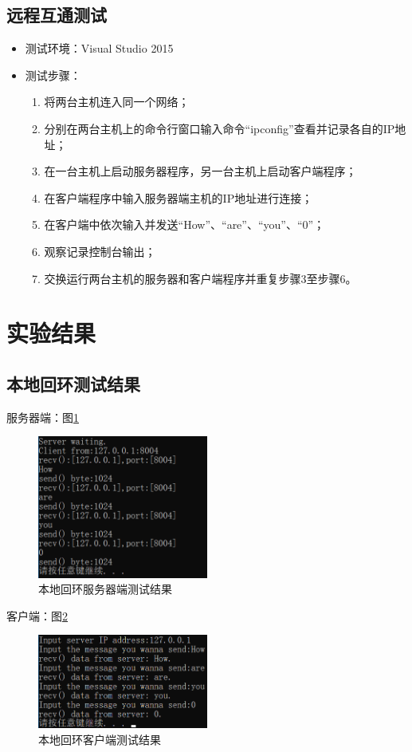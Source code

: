 \documentclass[a4paper]{ctexrep}
\begin{document}
\begin{spacing}{1.5}
\subsection{远程互通测试}
\begin{itemize}
	\item 测试环境：Visual Studio 2015
	\item 测试步骤：
	\begin{enumerate}
		\item 将两台主机连入同一个网络；
		\item 分别在两台主机上的命令行窗口输入命令“ipconfig”查看并记录各自的IP地址；
		\item 在一台主机上启动服务器程序，另一台主机上启动客户端程序；
		\item 在客户端程序中输入服务器端主机的IP地址进行连接；
		\item 在客户端中依次输入并发送“How”、“are”、“you”、“0”；
		\item 观察记录控制台输出；
		\item 交换运行两台主机的服务器和客户端程序并重复步骤3至步骤6。
	\end{enumerate}
\end{itemize}

\section{实验结果}
\subsection{本地回环测试结果}
服务器端：图\ref{localserver}
\begin{figure}[htbp]
	\centering
	\includegraphics [width=0.5\textwidth]{figure//localserver.png}
	\caption{本地回环服务器端测试结果}\label{localserver}
\end{figure}

客户端：图\ref{localclient}
\begin{figure}[htbp]
	\centering
	\includegraphics [width=0.5\textwidth]{figure//localclient.png}
	\caption{本地回环客户端测试结果}\label{localclient}
\end{figure}


\end{spacing}
\end{document}
